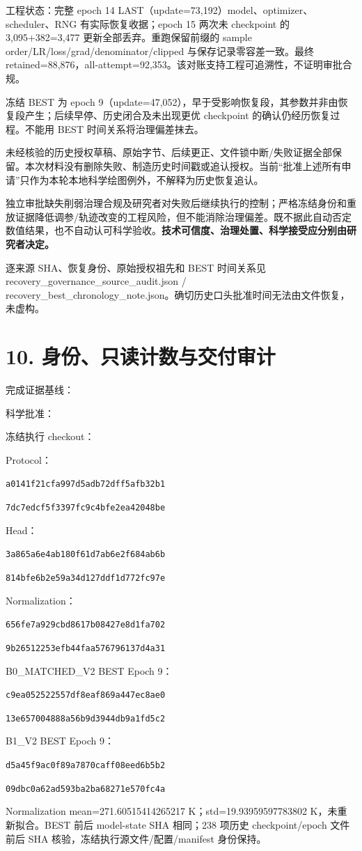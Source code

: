 \documentclass[UTF8,a4paper,10pt,fontset=windows]{ctexart}
\begin{document}
工程状态：完整 epoch 14 LAST（update=73,192）model、optimizer、scheduler、RNG 有实际恢复收据；epoch 15 两次未 checkpoint 的 3,095+382=3,477 更新全部丢弃。重跑保留前缀的 sample order/LR/loss/grad/denominator/clipped 与保存记录零容差一致。最终 retained=88,876，all-attempt=92,353。该对账支持工程可追溯性，不证明审批合规。

冻结 BEST 为 epoch 9（update=47,052），早于受影响恢复段，其参数并非由恢复段产生；后续早停、历史闭合及未出现更优 checkpoint 的确认仍经历恢复过程。不能用 BEST 时间关系将治理偏差抹去。

未经核验的历史授权草稿、原始字节、后续更正、文件锁中断/失败证据全部保留。本次材料没有删除失败、制造历史时间戳或追认授权。当前“批准上述所有申请”只作为本轮本地科学绘图例外，不解释为历史恢复追认。

独立审批缺失削弱治理合规及研究者对失败后继续执行的控制；严格冻结身份和重放证据降低调参/轨迹改变的工程风险，但不能消除治理偏差。既不据此自动否定数值结果，也不自动认可科学验收。\textbf{技术可信度、治理处置、科学接受应分别由研究者决定。}

逐来源 SHA、恢复身份、原始授权祖先和 BEST 时间关系见 recovery\_governance\_source\_audit.json / recovery\_best\_chronology\_note.json。确切历史口头批准时间无法由文件恢复，未虚构。
\newpage
\section*{10. 身份、只读计数与交付审计}
完成证据基线：\par
科学批准：\par
冻结执行 checkout：\par
Protocol：\par\noindent\texttt{a0141f21cfa997d5adb72dff5afb32b1}\par\noindent\texttt{7dc7edcf5f3397fc9c4bfe2ea42048be}\par
Head：\par\noindent\texttt{3a865a6e4ab180f61d7ab6e2f684ab6b}\par\noindent\texttt{814bfe6b2e59a34d127ddf1d772fc97e}\par
Normalization：\par\noindent\texttt{656fe7a929cbd8617b08427e8d1fa702}\par\noindent\texttt{9b26512253efb44faa576796137d4a31}\par
B0\_MATCHED\_V2 BEST Epoch 9：\par\noindent\texttt{c9ea052522557df8eaf869a447ec8ae0}\par\noindent\texttt{13e657004888a56b9d3944db9a1fd5c2}\par
B1\_V2 BEST Epoch 9：\par\noindent\texttt{d5a45f9ac0f89a7870caff08eed6b5b2}\par\noindent\texttt{09dbc0a62ad593ba2ba68271e570fc4a}\par
Normalization mean=271.60515414265217 K；std=19.93959597783802 K，未重新拟合。BEST 前后 model-state SHA 相同；238 项历史 checkpoint/epoch 文件前后 SHA 核验，冻结执行源文件/配置/manifest 身份保持。
\end{document}
